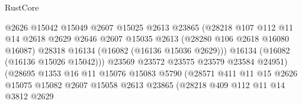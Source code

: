 \begin{lexlean}{RustCore}
\begin{coremodule}
                                        @2626
                                        @15042
                                        @15049
                                        @2607
                                        @15025
                                        @2613
                                        @23865
                                        (@28218
                                          @107
                                          @112
                                          @11
                                          @14
                                          @2618
                                          @2629
                                          @2646
                                          @2607
                                          @15035
                                          @2613
                                          (@28280 @106 @2618 @16080 @16087)
                                          @28318
                                          @16134
                                          (@16082 (@16136 @15036 @2629)))
                                        @16134
                                        (@16082 (@16136 @15026 @15042)))
                                      @23569
                                      @23572
                                      @23575
                                      @23579
                                      @23584
                                      @24951)
                                    (@28695
                                      @1353
                                      @16
                                      @11
                                      @15076
                                      @15083
                                      @5790
                                      (@28571
                                        @411
                                        @11
                                        @15
                                        @2626
                                        @15075
                                        @15082
                                        @2607
                                        @15058
                                        @2613
                                        @23865
                                        (@28218
                                          @409
                                          @112
                                          @11
                                          @14
                                          @3812
                                          @2629

\end{coremodule}
\end{lexlean}
